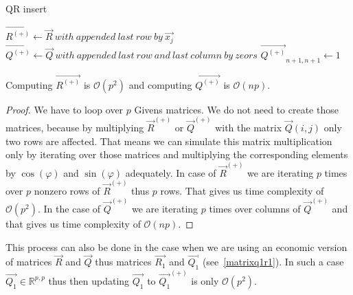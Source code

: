 \begin{algorithm}[H]
    \label{addingrowqr}

      \caption{QR insert}
      $\vec{R^{(+)}} \gets \vec{R}~with~appended~last~row~by~\vec{x_j}$\;
      $\vec{Q^{(+)}} \gets \vec{Q}~with~appended~last~row~and~last~column~by~zeors$\;
      $\vec{Q^{(+)}}_{n+1, n+1} \gets 1$ 


      

    \;
\end{algorithm}


\begin{observation} \label{qrinserttime}
Computing $\vec{R^{(+)}}$ is $\mathcal{O}(p^2)$ and computing $\vec{Q^{(+)}}$ is $\mathcal{O}(np)$.
\end{observation}

\begin{proof} \label{qrinsertproof}
We have to loop over $p$ Givens matrices. We do not need to create those matrices, because by multiplying $\vec{R}^{(+)}$ or $\vec{Q}^{(+)}$ with the matrix $\vec{Q}(i,j)$ only two rows are affected. That means we can simulate this matrix multiplication only by iterating over those matrices and multiplying the corresponding elements by $\cos(\varphi)$ and $\sin(\varphi)$ adequately. In case of $\vec{R}^{(+)}$ we are iterating $p$ times over $p$ nonzero rows of $\vec{R}^{(+)}$ thus $p$ rows. That gives us time complexity of $\mathcal{O}(p^2)$. In the case of $\vec{Q}^{(+)}$  we are iterating $p$ times over columns of $\vec{Q}^{(+)}$ and that gives us time complexity of $\mathcal{O}(np)$.
\end{proof}

\begin{note}
This process can also be done in the case when we are using an economic version of matrices $\vec{R}$ and $\vec{Q}$  thus matrices $\vec{R_1}$ and $\vec{Q_1}$ (see~\eqref{matrixq1r1}). In such a case
$\vec{Q_1} \in \mathbb{R}^{p, p}$ thus then updating $\vec{Q_1}$ to $\vec{Q_1}^{(+)}$ is only $\mathcal{O}(p^2)$.
\end{note}

